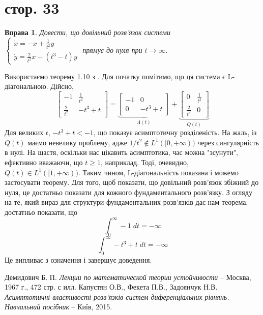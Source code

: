 \documentclass[12pt]{article} %
\newtheorem{prob}{Вправа}
\begin{document}
\section{стор. 33}
\setcounter{prob}{0}
\begin{prob}Довести, що довільний розв’язок системи\\
	$\begin{cases}\dot{x}=-x+\frac{1}{t^2}y\\\dot{y}=\frac{2}{t^2}x-(t^3-t)y\end{cases}$ прямує до нуля при $t\to\infty$.
\end{prob}
Використаємо теорему 1.10 з \cite{kapustyan}. Для початку помітимо, що ця система є L-діагональною. Дійсно,
\[\begin{bmatrix}-1&\frac{1}{t^2}\\\frac{2}{t^2}&-t^3+t\end{bmatrix}=\underbrace{\begin{bmatrix}-1&0\\0&-t^3+t\end{bmatrix}}_{\Lambda(t)}+
	\underbrace{\begin{bmatrix}0&\frac{1}{t^2}\\\frac{2}{t^2}&0\end{bmatrix}}_{Q(t)}\]
Для великих $t$, $-t^3+t<-1$, що показує асимптотичну розділеність. На жаль, із $Q(t)$ маємо невелику проблему, адже $1/t^2\notin L^1([0,+\infty))$
через сингулярність в нулі. На щастя, оскільки нас цікавить асимптотика, час можна "зсунути", ефективно вважаючи, що $t\geq1$, наприклад. Тоді,
очевидно, $Q(t)\in L^1([1,+\infty))$. Таким чином, L-діагональність показана і можемо застосувати теорему. Для того, щоб показати, що
довільний розв’язок збіжний до нуля, це достатньо показати для кожного фундаментального розв’язку. З огляду на те, який вираз
для структури фундаментальних розв’язків дає нам теорема, достатньо показати, що
\[\int_0^\infty-1\;dt=-\infty\]
\[\int_0^\infty-t^3+t\;dt=-\infty\]
Це випливає з означення і завершує доведення.
\begin{thebibliography}{9}
Демидович Б. П. \emph{Лекции по математической теории устойчивости} --
Москва, 1967 г., 472 стр. с илл.
	Капустян О.В., Фекета П.В., Задоянчук Н.В. \emph{Асимптотичні властивості розв’язків систем диференціальних рівнянь. Навчальний
	посібник} -- Київ, 2015.
\end{thebibliography}
\end{document}
